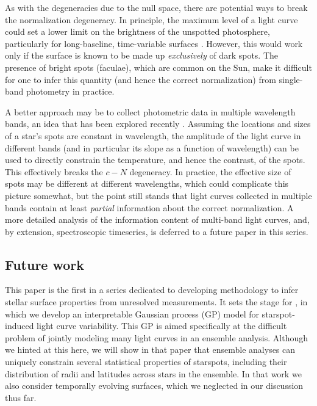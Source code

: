\documentclass[modern]{aastex62}
\begin{document}

As with the degeneracies due to the null space, there are potential ways
to break the normalization degeneracy.
%
In principle, the maximum level of a light curve could set a lower limit on
the brightness of the
unspotted photosphere, particularly for long-baseline, time-variable
surfaces \citep{Basri2018}. However, this would work only if the surface is
known to be made up \emph{exclusively} of dark spots. The presence of bright
spots (faculae), which are common on the Sun, make it difficult
for one to infer this quantity (and hence the correct normalization)
from single-band photometry in practice.

A better approach may be to collect photometric data in
multiple wavelength bands, an idea that has
been explored recently \citep[e.g.,][]{Gully2017,Guo2018}. Assuming the
locations and sizes of a star's spots are constant in wavelength, the amplitude
of the light curve in different bands (and in particular its slope as a function
of wavelength) can be used to directly constrain the
temperature, and hence the contrast, of the spots. This effectively breaks the
$c-N$ degeneracy. In practice, the effective size of spots may be different
at different wavelengths, which could complicate this picture somewhat, but
the point still stands that light curves collected in multiple bands
contain at least \emph{partial} information about the correct normalization.
%
A more detailed analysis of the information content of multi-band light curves,
and, by extension, spectroscopic timeseries, is deferred to a future paper
in this series.

\subsection{Future work}

This paper is the first in a series dedicated to developing
methodology to infer stellar surface properties from
unresolved measurements. It sets the stage for \citet{PaperII},
in which we develop an interpretable Gaussian process (GP) model for
starspot-induced light curve variability. This GP is aimed specifically
at the difficult problem of jointly modeling many light curves
in an ensemble analysis. Although we hinted at this here, we will show
in that paper that ensemble analyses can uniquely constrain several
statistical properties of starspots, including their distribution
of radii and latitudes across stars in the ensemble. In that work
we also consider temporally evolving surfaces, which we neglected
in our discussion thus far.
\end{document}
